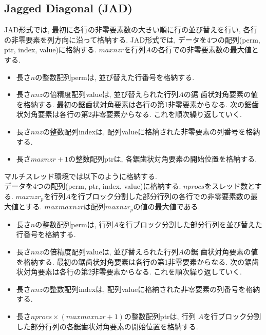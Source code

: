 \documentclass[a4paper]{jarticle}
\begin{document}
{{\newpage
\subsection{Jagged Diagonal (JAD)}
JAD形式では, 最初に各行の非零要素数の大きい順に行の並び替えを行い, 
各行の非零要素を列方向に沿って格納する. 
JAD形式では, データを4つの配列({\ttfamily perm, ptr, index, value})に格納する. 
$maxnzr$を行列$A$の各行での非零要素数の最大値とする. 
\begin{itemize}
\item 長さ$n$の整数配列{\ttfamily perm}は, 並び替えた行番号を格納する. 
\item 長さ$nnz$の倍精度配列{\ttfamily value}は, 並び替えられた行列$A$の鋸
      歯状対角要素の値を格納する. 
最初の鋸歯状対角要素は各行の第1非零要素からなる. 
次の鋸歯状対角要素は各行の第2非零要素からなる. これを順次繰り返していく. 
\item 長さ$nnz$の整数配列{\ttfamily index}は, 配列{\ttfamily value}に格納された非零要素の列番号を格納する. 
\item 長さ$maxnzr + 1$の整数配列{\ttfamily ptr}は, 各鋸歯状対角要素の開始位置を格納する. 
\end{itemize}
マルチスレッド環境では以下のように格納する.\\
データを4つの配列({\ttfamily perm, ptr, index, value})に格納する. 
$nprocs$をスレッド数とする. 
$maxnzr_p$を行列$A$を行ブロック分割した部分行列の各行での非零要素数の最大値とする. 
$maxmaxnzr$は配列$maxnzr_p$の値の最大値である. 
\begin{itemize}
\item 長さ$n$の整数配列{\ttfamily perm}は, 行列$A$を行ブロック分割した部分行列を並び替えた行番号を格納する. 
\item 長さ$nnz$の倍精度配列{\ttfamily value}は, 並び替えられた行列$A$の鋸
      歯状対角要素の値を格納する. 
最初の鋸歯状対角要素は各行の第1非零要素からなる. 
次の鋸歯状対角要素は各行の第2非零要素からなる. これを順次繰り返していく. 
\item 長さ$nnz$の整数配列{\ttfamily index}は, 配列{\ttfamily value}に格納された非零要素の列番号を格納する. 
\item 長さ$nprocs \times (maxmaxnzr + 1)$の整数配列{\ttfamily ptr}は, 行列
      $A$を行ブロック分割した部分行列の各鋸歯状対角要素の開始位置を格納する. 
\end{itemize}

\newpage
}}
\end{document}
